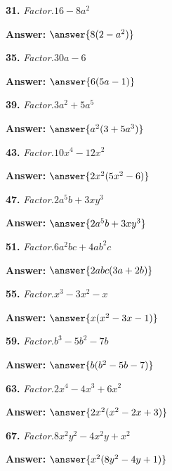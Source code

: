 \documentclass{ximera}
\begin{document}
\begin{problem}
\textbf{31.} \emph{Factor.}\quad $16 - 8a^2$

\textbf{Answer:} $\answer{8(2 -a^2)}$
\end{problem}

\begin{problem}
\textbf{35.} \emph{Factor.}\quad $30a - 6$

\textbf{Answer:} $\answer{6(5a -1)}$
\end{problem}

\begin{problem}
\textbf{39.} \emph{Factor.}\quad $3a^2 + 5a^5$

\textbf{Answer:} $\answer{a^2(3 +5a^3)}$
\end{problem}

\begin{problem}
\textbf{43.} \emph{Factor.}\quad $10x^4 - 12x^2$

\textbf{Answer:} $\answer{2x^2(5x^2 -6)}$
\end{problem}

\begin{problem}
\textbf{47.} \emph{Factor.}\quad $2a^5b + 3xy^3$

\textbf{Answer:} $\answer{2a^5b +3xy^3}$
\end{problem}

\begin{problem}
\textbf{51.} \emph{Factor.}\quad $6a^2bc + 4ab^2c$

\textbf{Answer:} $\answer{2abc(3a +2b)}$
\end{problem}

\begin{problem}
\textbf{55.} \emph{Factor.}\quad $x^3 - 3x^2 - x$

\textbf{Answer:} $\answer{x(x^2 -3x -1)}$
\end{problem}

\begin{problem}
\textbf{59.} \emph{Factor.}\quad $b^3 - 5b^2 - 7b$

\textbf{Answer:} $\answer{b(b^2 -5b -7)}$
\end{problem}

\begin{problem}
\textbf{63.} \emph{Factor.}\quad $2x^4 - 4x^3 + 6x^2$

\textbf{Answer:} $\answer{2x^2(x^2 -2x +3)}$
\end{problem}

\begin{problem}
\textbf{67.} \emph{Factor.}\quad $8x^2y^2 - 4x^2y + x^2$

\textbf{Answer:} $\answer{x^2(8y^2 -4y +1)}$
\end{problem}
\end{document}
